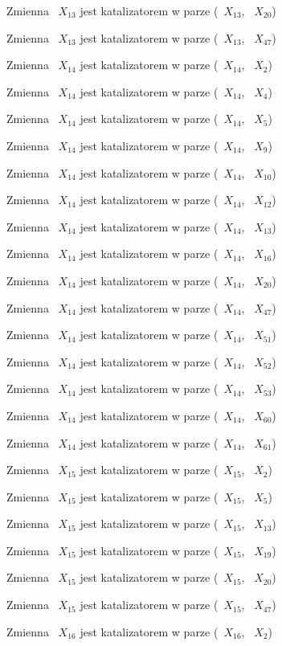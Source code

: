 \documentclass{article}
\begin{document}
Zmienna ~$X_{13}$ jest katalizatorem w parze (~$X_{13}$, ~$X_{20}$)

Zmienna ~$X_{13}$ jest katalizatorem w parze (~$X_{13}$, ~$X_{47}$)

Zmienna ~$X_{14}$ jest katalizatorem w parze (~$X_{14}$, ~$X_{2}$)

Zmienna ~$X_{14}$ jest katalizatorem w parze (~$X_{14}$, ~$X_{4}$)

Zmienna ~$X_{14}$ jest katalizatorem w parze (~$X_{14}$, ~$X_{5}$)

Zmienna ~$X_{14}$ jest katalizatorem w parze (~$X_{14}$, ~$X_{9}$)

Zmienna ~$X_{14}$ jest katalizatorem w parze (~$X_{14}$, ~$X_{10}$)

Zmienna ~$X_{14}$ jest katalizatorem w parze (~$X_{14}$, ~$X_{12}$)

Zmienna ~$X_{14}$ jest katalizatorem w parze (~$X_{14}$, ~$X_{13}$)

Zmienna ~$X_{14}$ jest katalizatorem w parze (~$X_{14}$, ~$X_{16}$)

Zmienna ~$X_{14}$ jest katalizatorem w parze (~$X_{14}$, ~$X_{20}$)

Zmienna ~$X_{14}$ jest katalizatorem w parze (~$X_{14}$, ~$X_{47}$)

Zmienna ~$X_{14}$ jest katalizatorem w parze (~$X_{14}$, ~$X_{51}$)

Zmienna ~$X_{14}$ jest katalizatorem w parze (~$X_{14}$, ~$X_{52}$)

Zmienna ~$X_{14}$ jest katalizatorem w parze (~$X_{14}$, ~$X_{53}$)

Zmienna ~$X_{14}$ jest katalizatorem w parze (~$X_{14}$, ~$X_{60}$)

Zmienna ~$X_{14}$ jest katalizatorem w parze (~$X_{14}$, ~$X_{61}$)

Zmienna ~$X_{15}$ jest katalizatorem w parze (~$X_{15}$, ~$X_{2}$)

Zmienna ~$X_{15}$ jest katalizatorem w parze (~$X_{15}$, ~$X_{5}$)

Zmienna ~$X_{15}$ jest katalizatorem w parze (~$X_{15}$, ~$X_{13}$)

Zmienna ~$X_{15}$ jest katalizatorem w parze (~$X_{15}$, ~$X_{19}$)

Zmienna ~$X_{15}$ jest katalizatorem w parze (~$X_{15}$, ~$X_{20}$)

Zmienna ~$X_{15}$ jest katalizatorem w parze (~$X_{15}$, ~$X_{47}$)

Zmienna ~$X_{16}$ jest katalizatorem w parze (~$X_{16}$, ~$X_{2}$)
\end{document}
